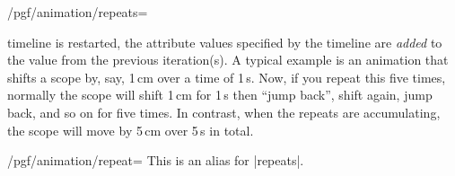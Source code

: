 \begin{key}{/pgf/animation/repeats=}
\begin{itemize}
            timeline is restarted, the attribute values specified by the
            timeline are \emph{added} to the value from the previous
            iteration(s). A typical example is an animation that shifts a scope
            by, say, 1\,cm over a time of 1\,s. Now, if you repeat this five
            times, normally the scope will shift 1\,cm for 1\,s then ``jump
            back'', shift again, jump back, and so on for five times. In
            contrast, when the repeats are accumulating, the scope will move by
            5\,cm over 5\,s in total.
\begin{codeexample}[
    preamble={\usepgfmodule{animations}},
    animation list={1,2,3,4,5},
]
\end{codeexample}
\begin{codeexample}[
    preamble={\usepgfmodule{animations}},
    animation list={1,2,3,4,5},
]
\end{codeexample}
    \end{itemize}
\end{key}

\begin{key}{/pgf/animation/repeat=}
    This is an alias for |repeats|.
\end{key}



